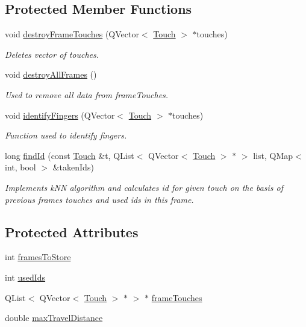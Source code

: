 \subsection*{Protected Member Functions}
\begin{DoxyCompactItemize}
\item 
void \hyperlink{class_tracker_a56fa2db181830d3ae47c06cef7c3a8ac}{destroyFrameTouches} (QVector$<$ \hyperlink{class_touch}{Touch} $>$ $\ast$touches)
\begin{DoxyCompactList}\small\item\em Deletes vector of touches. \item\end{DoxyCompactList}\item 
\hypertarget{class_tracker_a812f270cb8d6c2ecb41d404c72fb4f42}{
void \hyperlink{class_tracker_a812f270cb8d6c2ecb41d404c72fb4f42}{destroyAllFrames} ()}
\label{de/dbb/class_tracker_a812f270cb8d6c2ecb41d404c72fb4f42}

\begin{DoxyCompactList}\small\item\em Used to remove all data from frameTouches. \item\end{DoxyCompactList}\item 
void \hyperlink{class_tracker_a6e74d0e762937b997d46dbbff2b8a8f5}{identifyFingers} (QVector$<$ \hyperlink{class_touch}{Touch} $>$ $\ast$touches)
\begin{DoxyCompactList}\small\item\em Function used to identify fingers. \item\end{DoxyCompactList}\item 
long \hyperlink{class_tracker_a051f554f543f0f4d4675e5c727de5e53}{findId} (const \hyperlink{class_touch}{Touch} \&t, QList$<$ QVector$<$ \hyperlink{class_touch}{Touch} $>$ $\ast$ $>$ list, QMap$<$ int, bool $>$ \&takenIds)
\begin{DoxyCompactList}\small\item\em Implements kNN algorithm and calculates id for given touch on the basis of previous frames touches and used ids in this frame. \item\end{DoxyCompactList}\end{DoxyCompactItemize}
\subsection*{Protected Attributes}
\begin{DoxyCompactItemize}
\item 
int \hyperlink{class_tracker_a601db61af5b01acaa4b73f13013e52f0}{framesToStore}
\item 
int \hyperlink{class_tracker_afd3b08a68c5e668917f949282dbe9068}{usedIds}
\item 
QList$<$ QVector$<$ \hyperlink{class_touch}{Touch} $>$ $\ast$ $>$ $\ast$ \hyperlink{class_tracker_a702ac376de188e180cd5a8111cf92752}{frameTouches}
\item 
double \hyperlink{class_tracker_a31fcaab957d7fcb34fb32797128f14b4}{maxTravelDistance}
\end{DoxyCompactItemize}


